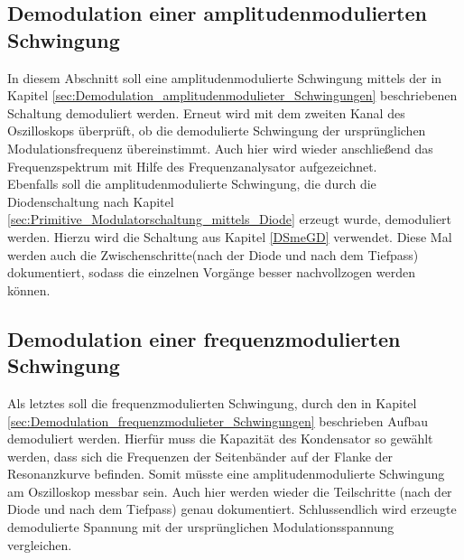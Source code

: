 \subsection{Demodulation einer amplitudenmodulierten Schwingung}
In diesem Abschnitt soll eine amplitudenmodulierte Schwingung mittels der in Kapitel \ref{sec:Demodulation_amplitudenmodulieter_Schwingungen} beschriebenen Schaltung demoduliert werden. Erneut wird mit dem zweiten Kanal des Oszilloskops überprüft, ob die demodulierte Schwingung der ursprünglichen Modulationsfrequenz übereinstimmt. Auch hier wird wieder anschließend das Frequenzspektrum mit Hilfe des Frequenzanalysator aufgezeichnet.
\\
Ebenfalls soll die amplitudenmodulierte Schwingung, die durch die Diodenschaltung nach Kapitel \ref{sec:Primitive_Modulatorschaltung_mittels_Diode} erzeugt wurde, demoduliert werden. Hierzu wird die Schaltung aus Kapitel \ref{DSmeGD} verwendet. Diese Mal werden auch die Zwischenschritte(nach der Diode und nach dem Tiefpass) dokumentiert, sodass die einzelnen Vorgänge besser nachvollzogen werden können.

\subsection{Demodulation einer frequenzmodulierten Schwingung}
Als letztes soll die frequenzmodulierten Schwingung, durch den in Kapitel \ref{sec:Demodulation_frequenzmodulieter_Schwingungen} beschrieben Aufbau demoduliert werden. Hierfür muss die Kapazität des Kondensator so gewählt werden, dass sich die Frequenzen der Seitenbänder auf der Flanke der Resonanzkurve befinden. Somit müsste eine amplitudenmodulierte Schwingung am Oszilloskop messbar sein. Auch hier werden wieder die Teilschritte (nach der Diode und nach dem Tiefpass) genau dokumentiert. Schlussendlich wird erzeugte demodulierte Spannung mit der ursprünglichen Modulationsspannung vergleichen. 